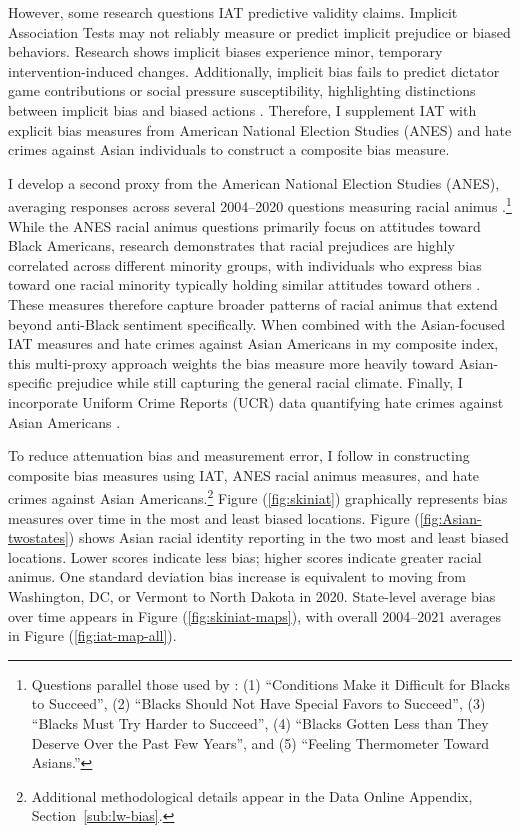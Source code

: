 However, some research questions IAT predictive validity claims. Implicit Association Tests may not reliably measure or predict implicit prejudice or biased behaviors. Research shows implicit biases experience minor, temporary intervention-induced changes. Additionally, implicit bias fails to predict dictator game contributions or social pressure susceptibility, highlighting distinctions between implicit bias and biased actions \autocite{arkesAttributionsImplicitPrejudice2004,forscherMetaanalysisProceduresChange2019,leeDoesImplicitBias2018}. Therefore, I supplement IAT with explicit bias measures from American National Election Studies (ANES) and hate crimes against Asian individuals to construct a composite bias measure.

I develop a second proxy from the American National Election Studies (ANES), averaging responses across several 2004--2020 questions measuring racial animus \autocite{anes2021}.\footnote{Questions parallel those used by \textcite{charlesPrejudiceWagesEmpirical2008}: (1) ``Conditions Make it Difficult for Blacks to Succeed'', (2) ``Blacks Should Not Have Special Favors to Succeed'', (3) ``Blacks Must Try Harder to Succeed'', (4) ``Blacks Gotten Less than They Deserve Over the Past Few Years'', and (5) ``Feeling Thermometer Toward Asians.''} While the ANES racial animus questions primarily focus on attitudes toward Black Americans, research demonstrates that racial prejudices are highly correlated across different minority groups, with individuals who express bias toward one racial minority typically holding similar attitudes toward others \autocite{almasalkhi2023links, mora2020antiblackness}. These measures therefore capture broader patterns of racial animus that extend beyond anti-Black sentiment specifically. When combined with the Asian-focused IAT measures and hate crimes against Asian Americans in my composite index, this multi-proxy approach weights the bias measure more heavily toward Asian-specific prejudice while still capturing the general racial climate. Finally, I incorporate Uniform Crime Reports (UCR) data quantifying hate crimes against Asian Americans \autocite{ucrbook}.

To reduce attenuation bias and measurement error, I follow \textcite{lubotskyInterpretationRegressionsMultiple2006} in constructing composite bias measures using IAT, ANES racial animus measures, and hate crimes against Asian Americans.\footnote{Additional methodological details appear in the Data Online Appendix, Section~\ref{sub:lw-bias}.} Figure (\ref{fig:skiniat}) graphically represents bias measures over time in the most and least biased locations. Figure (\ref{fig:Asian-twostates}) shows Asian racial identity reporting in the two most and least biased locations. Lower scores indicate less bias; higher scores indicate greater racial animus. One standard deviation bias increase is equivalent to moving from Washington, DC, or Vermont to North Dakota in 2020. State-level average bias over time appears in Figure (\ref{fig:skiniat-maps}), with overall 2004--2021 averages in Figure (\ref{fig:iat-map-all}).

